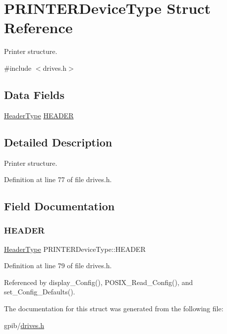 \hypertarget{structPRINTERDeviceType}{}\section{P\+R\+I\+N\+T\+E\+R\+Device\+Type Struct Reference}
\label{structPRINTERDeviceType}


Printer structure.  




{\ttfamily \#include $<$drives.\+h$>$}

\subsection*{Data Fields}
\begin{DoxyCompactItemize}
\item 
\hyperlink{structHeaderType}{Header\+Type} \hyperlink{structPRINTERDeviceType_ac1ae5b29520f726e4aaab0232ecd6463}{H\+E\+A\+D\+ER}
\end{DoxyCompactItemize}


\subsection{Detailed Description}
Printer structure. 

Definition at line 77 of file drives.\+h.



\subsection{Field Documentation}
\mbox{\label{structPRINTERDeviceType_ac1ae5b29520f726e4aaab0232ecd6463}} 
\subsubsection{\texorpdfstring{H\+E\+A\+D\+ER}{HEADER}}
{\footnotesize\ttfamily \hyperlink{structHeaderType}{Header\+Type} P\+R\+I\+N\+T\+E\+R\+Device\+Type\+::\+H\+E\+A\+D\+ER}



Definition at line 79 of file drives.\+h.



Referenced by display\+\_\+\+Config(), P\+O\+S\+I\+X\+\_\+\+Read\+\_\+\+Config(), and set\+\_\+\+Config\+\_\+\+Defaults().



The documentation for this struct was generated from the following file\+:\begin{DoxyCompactItemize}
\item 
gpib/\hyperlink{drives_8h}{drives.\+h}\end{DoxyCompactItemize}
